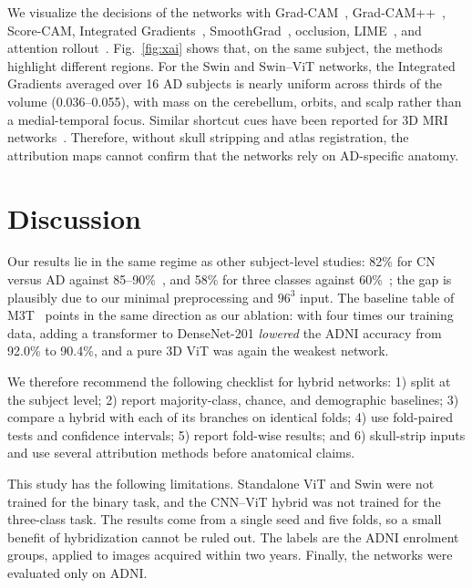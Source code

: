 \documentclass[conference,a4paper]{IEEEtran}
\begin{document}
We visualize the decisions of the networks with Grad-CAM~\cite{selvaraju2017gradcam}, Grad-CAM++~\cite{chattopadhay2018gradcampp}, Score-CAM, Integrated Gradients~\cite{sundararajan2017axiomatic}, SmoothGrad~\cite{smilkov2017smoothgrad}, occlusion, LIME~\cite{ribeiro2016why}, and attention rollout~\cite{abnar2020quantifying}. Fig.~\ref{fig:xai} shows that, on the same subject, the methods highlight different regions. For the Swin and Swin--ViT networks, the Integrated Gradients averaged over 16 AD subjects is nearly uniform across thirds of the volume (0.036--0.055), with mass on the cerebellum, orbits, and scalp rather than a medial-temporal focus. Similar shortcut cues have been reported for 3D MRI networks~\cite{rumala2023split}. Therefore, without skull stripping and atlas registration, the attribution maps cannot confirm that the networks rely on AD-specific anatomy.

\section{Discussion}
Our results lie in the same regime as other subject-level studies: 82\% for CN versus AD against 85--90\%~\cite{wen2020convolutional,saoud2024explainable}, and 58\% for three classes against 60\%~\cite{saoud2024explainable}; the gap is plausibly due to our minimal preprocessing and $96^3$ input. The baseline table of M3T~\cite{jang2022m3t} points in the same direction as our ablation: with four times our training data, adding a transformer to DenseNet-201 \emph{lowered} the ADNI accuracy from 92.0\% to 90.4\%, and a pure 3D ViT was again the weakest network.

We therefore recommend the following checklist for hybrid networks: 1) split at the subject level; 2) report majority-class, chance, and demographic baselines; 3) compare a hybrid with each of its branches on identical folds; 4) use fold-paired tests and confidence intervals; 5) report fold-wise results; and 6) skull-strip inputs and use several attribution methods before anatomical claims.

This study has the following limitations. Standalone ViT and Swin were not trained for the binary task, and the CNN--ViT hybrid was not trained for the three-class task. The results come from a single seed and five folds, so a small benefit of hybridization cannot be ruled out. The labels are the ADNI enrolment groups, applied to images acquired within two years. Finally, the networks were evaluated only on ADNI.
\end{document}
